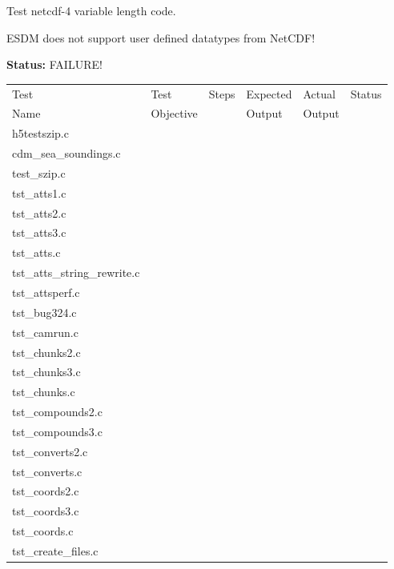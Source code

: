 Test netcdf-4 variable length code.

ESDM does not support user defined datatypes from NetCDF!

{\bf \large Status: } FAILURE!

\clearpage

\begin{table}[H]
\centering
\begin{tabular}{|m{2cm}|m{3cm}|m{3cm}|m{3cm}|m{3cm}|m{2cm}|}
\hline
Test & Test       & Steps   & Expected  & Actual & Status\\
Name & Objective  &         & Output    & Output &               \\ \hline \hline
h5testszip.c   &   &   &   &   &   \\ \hline
cdm\_sea\_soundings.c   &   &   &   &   &   \\ \hline
test\_szip.c   &   &   &   &   &   \\ \hline
tst\_atts1.c   &   &   &   &   &   \\ \hline
tst\_atts2.c   &   &   &   &   &   \\ \hline
tst\_atts3.c   &   &   &   &   &   \\ \hline
tst\_atts.c   &   &   &   &   &   \\ \hline
tst\_atts\_string\_rewrite.c   &   &   &   &   &   \\ \hline
tst\_attsperf.c   &   &   &   &   &   \\ \hline
tst\_bug324.c   &   &   &   &   &   \\ \hline
tst\_camrun.c   &   &   &   &   &   \\ \hline
tst\_chunks2.c   &   &   &   &   &   \\ \hline
tst\_chunks3.c   &   &   &   &   &   \\ \hline
tst\_chunks.c   &   &   &   &   &   \\ \hline
tst\_compounds2.c   &   &   &   &   &   \\ \hline
tst\_compounds3.c   &   &   &   &   &   \\ \hline
tst\_converts2.c   &   &   &   &   &   \\ \hline
tst\_converts.c   &   &   &   &   &   \\ \hline
tst\_coords2.c   &   &   &   &   &   \\ \hline
tst\_coords3.c   &   &   &   &   &   \\ \hline
tst\_coords.c   &   &   &   &   &   \\ \hline
tst\_create\_files.c   &   &   &   &   &   \\ \hline

\end{tabular}
\end{table}
